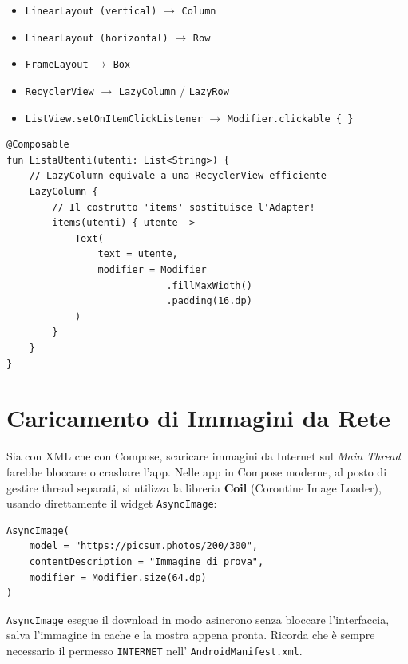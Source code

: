 \begin{tcolorbox}[colback=yellow!10!white,colframe=yellow!70!black,title=Confronto XML vs Compose (Utile per i quiz)]
    \begin{itemize}
        \item \texttt{LinearLayout (vertical)} $\rightarrow$ \texttt{Column}
        \item \texttt{LinearLayout (horizontal)} $\rightarrow$ \texttt{Row}
        \item \texttt{FrameLayout} $\rightarrow$ \texttt{Box}
        \item \texttt{RecyclerView} $\rightarrow$ \texttt{LazyColumn} / \texttt{LazyRow}
        \item \texttt{ListView.setOnItemClickListener} $\rightarrow$ \texttt{Modifier.clickable \{ \}}
    \end{itemize}
\end{tcolorbox}

\begin{lstlisting}[caption={Creare una lista in Jetpack Compose}]
@Composable
fun ListaUtenti(utenti: List<String>) {
    // LazyColumn equivale a una RecyclerView efficiente
    LazyColumn {
        // Il costrutto 'items' sostituisce l'Adapter!
        items(utenti) { utente ->
            Text(
                text = utente,
                modifier = Modifier
                            .fillMaxWidth()
                            .padding(16.dp)
            )
        }
    }
}
\end{lstlisting}

\section{Caricamento di Immagini da Rete}
Sia con XML che con Compose, scaricare immagini da Internet sul \textit{Main Thread} farebbe bloccare o crashare l'app.
Nelle app in Compose moderne, al posto di gestire thread separati, si utilizza la libreria \textbf{Coil} (Coroutine Image Loader), usando direttamente il widget \texttt{AsyncImage}:
\begin{lstlisting}[caption={AsyncImage con Coil}]
AsyncImage(
    model = "https://picsum.photos/200/300",
    contentDescription = "Immagine di prova",
    modifier = Modifier.size(64.dp)
)
\end{lstlisting}
\texttt{AsyncImage} esegue il download in modo asincrono senza bloccare l'interfaccia, salva l'immagine in cache e la mostra appena pronta.
Ricorda che è sempre necessario il permesso \texttt{INTERNET} nell' \texttt{AndroidManifest.xml}.